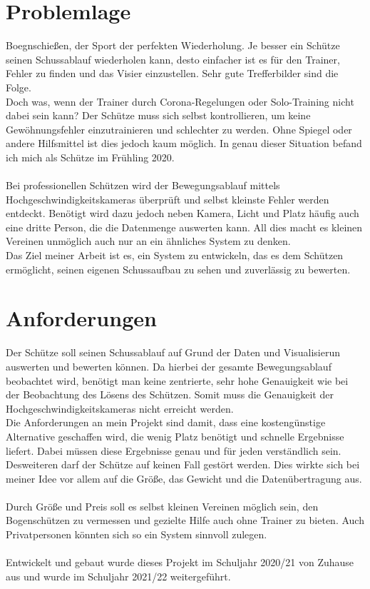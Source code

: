 \section{Problemlage}
Boegnschießen, der Sport der perfekten Wiederholung. Je besser ein Schütze seinen Schussablauf wiederholen kann, 
desto einfacher ist es für den Trainer, Fehler zu finden und das Visier einzustellen. Sehr gute Trefferbilder sind 
die Folge.\\
Doch was, wenn der Trainer durch Corona-Regelungen oder Solo-Training nicht dabei sein kann? Der Schütze muss sich
selbst kontrollieren, um keine Gewöhnungsfehler einzutrainieren und schlechter zu werden. Ohne Spiegel oder andere 
Hilfsmittel ist dies jedoch kaum möglich. In genau dieser Situation befand ich mich als Schütze im Frühling 2020.\\ 
\\
Bei professionellen Schützen wird der Bewegungsablauf mittels Hochgeschwindigkeitskameras überprüft und selbst kleinste
Fehler werden entdeckt. Benötigt wird dazu jedoch neben Kamera, Licht und Platz häufig auch eine dritte Person, die die
Datenmenge auswerten kann. All dies macht es kleinen Vereinen unmöglich auch nur an ein ähnliches System zu denken.\\
Das Ziel meiner Arbeit ist es, ein System zu entwickeln, das es dem Schützen ermöglicht, seinen eigenen Schussaufbau 
zu sehen und zuverlässig zu bewerten. 

\section{Anforderungen}
Der Schütze soll seinen Schussablauf auf Grund der Daten und Visualisierun auswerten und bewerten können.
Da hierbei der gesamte Bewegungsablauf beobachtet wird, benötigt man keine zentrierte, sehr hohe Genauigkeit wie bei der 
Beobachtung des Lösens des Schützen. Somit muss die Genauigkeit der Hochgeschwindigkeitskameras nicht erreicht werden.
\\
Die Anforderungen an mein Projekt sind damit, dass eine kostengünstige Alternative 
geschaffen wird, die wenig Platz benötigt und schnelle Ergebnisse liefert. Dabei müssen diese 
Ergebnisse genau und für jeden verständlich sein.\\
Desweiteren darf der Schütze auf keinen Fall gestört werden.
Dies wirkte sich bei meiner Idee vor allem auf die Größe, das Gewicht und die 
Datenübertragung aus.\\
\\
Durch Größe und Preis soll es selbst kleinen Vereinen möglich sein, den Bogenschützen zu vermessen und gezielte Hilfe
auch ohne Trainer zu bieten. Auch Privatpersonen könnten sich so ein System sinnvoll zulegen.\\
\\
Entwickelt und gebaut wurde dieses Projekt im Schuljahr 2020/21 von Zuhause aus und wurde 
im Schuljahr 2021/22 weitergeführt.

